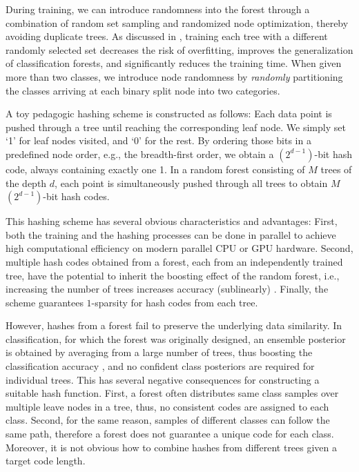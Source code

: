 \documentclass[runningheads]{llncs}
\begin{document}
During training, we can introduce randomness into the forest through a
combination of random set sampling and randomized node optimization, thereby
avoiding duplicate trees.  As discussed in \cite{RF2001, RFBook}, training each
tree with a different randomly selected set decreases the risk of overfitting,
improves the generalization of classification forests, and significantly reduces
the training time. When given more than two classes, we introduce node
randomness by \emph{randomly} partitioning the classes arriving at each binary
split node into two categories.

A toy pedagogic hashing scheme is constructed as follows: Each data point is
pushed through a tree until reaching the corresponding leaf node. We simply set
`1' for leaf nodes visited, and `0' for the rest.  By ordering those bits in a
predefined node order, e.g., the breadth-first order, we obtain a
$(2^{d-1})$-bit hash code, always containing exactly one 1.  In a random forest
consisting of $M$ trees of the depth $d$, each point is simultaneously pushed
through all trees to obtain $M$ $(2^{d-1})$-bit hash codes.

This hashing scheme has several obvious characteristics and advantages: First,
both the training and the hashing processes can be done in parallel to achieve
high computational efficiency on modern parallel CPU or GPU hardware.  Second,
multiple hash codes obtained from a forest, each from an independently trained
tree, have the potential to inherit the boosting effect of the random forest,
i.e., increasing the number of trees increases accuracy (sublinearly)
\cite{RFBook}.  Finally, the scheme guarantees $1$-sparsity for hash codes from
each tree.


However, hashes from a forest fail to preserve the underlying data similarity.
In classification, for which the forest was originally designed, an ensemble
posterior is obtained by averaging from a large number of trees, thus boosting
the classification accuracy \cite{RF2001}, and no confident class posteriors are
required for individual trees. This has several negative consequences for
constructing a suitable hash function. First, a forest often distributes same
class samples over multiple leave nodes in a tree, thus, no consistent codes are
assigned to each class. Second, for the same reason, samples of different
classes can follow the same path, therefore a forest does not guarantee a unique
code for each class. Moreover, it is not obvious how to combine hashes from
different trees given a target code length.
\end{document}
